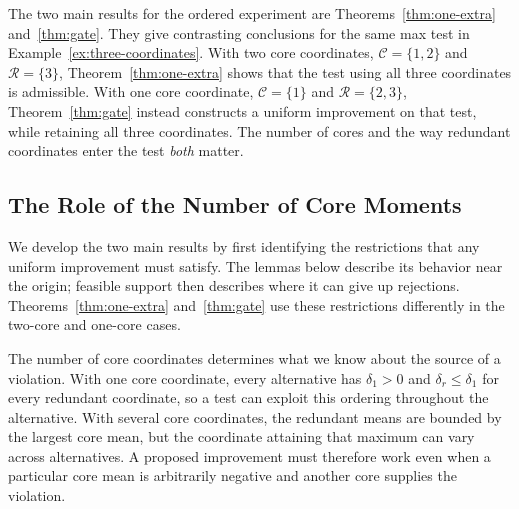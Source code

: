 \documentclass[11pt]{article}
\numberwithin{equation}{section}
\theoremstyle{definition}
\begin{document}
The two main results for the ordered experiment are Theorems~\ref{thm:one-extra} and~\ref{thm:gate}. They give contrasting conclusions for the same max test in Example~\ref{ex:three-coordinates}. With two core coordinates, $\mathcal C=\{1,2\}$ and $\mathcal R=\{3\}$, Theorem~\ref{thm:one-extra} shows that the test using all three coordinates is admissible. With one core coordinate, $\mathcal C=\{1\}$ and $\mathcal R=\{2,3\}$, Theorem~\ref{thm:gate} instead constructs a uniform improvement on that test, while retaining all three coordinates. The number of cores and the way redundant coordinates enter the test \emph{both} matter.


\subsection{The Role of the Number of Core Moments}\label{sec:core-count}

We develop the two main results by first identifying the restrictions that any uniform improvement must satisfy. The lemmas below describe its behavior near the origin; feasible support then describes where it can give up rejections. Theorems~\ref{thm:one-extra} and~\ref{thm:gate} use these restrictions differently in the two-core and one-core cases.

The number of core coordinates determines what we know about the source of a violation. With one core coordinate, every alternative has $\delta_1>0$ and $\delta_r\le\delta_1$ for every redundant coordinate, so a test can exploit this ordering throughout the alternative. With several core coordinates, the redundant means are bounded by the largest core mean, but the coordinate attaining that maximum can vary across alternatives. A proposed improvement must therefore work even when a particular core mean is arbitrarily negative and another core supplies the violation.
\end{document}

